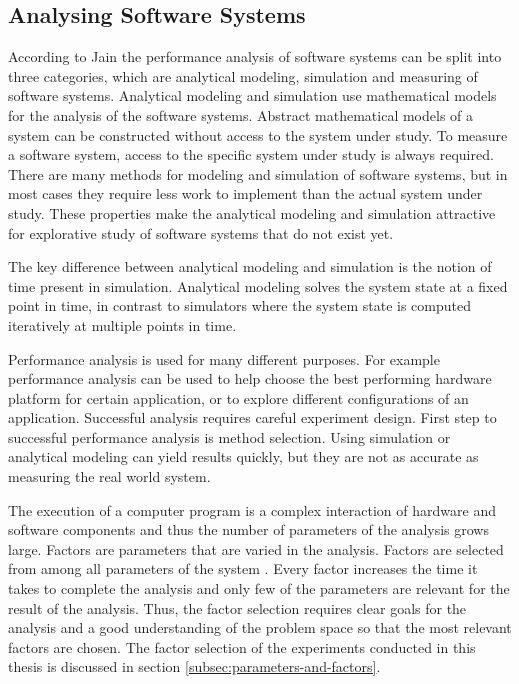 \subsection{Analysing Software Systems}
\label{subsec:analysing-software}
According to Jain \cite{jain1991art} the performance analysis of software systems can be split into three categories, which are analytical modeling, simulation and measuring of software systems. Analytical modeling and simulation use mathematical models for the analysis of the software systems. Abstract mathematical models of a system can be constructed without access to the system under study. To measure a software system, access to the specific system under study is always required. There are many methods for modeling and simulation of software systems, but in most cases they require less work to implement than the actual system under study. These properties make the analytical modeling and simulation attractive for explorative study of software systems that do not exist yet.~\cite{jain1991art}

The key difference between analytical modeling and simulation is the notion of time present in simulation. Analytical modeling solves the system state at a fixed point in time, in contrast to simulators where the system state is computed iteratively at multiple points in time.~\cite{jain1991art}

Performance analysis is used for many different purposes. For example performance analysis can be used to help choose the best performing hardware platform for certain application, or to explore different configurations of an application. Successful analysis requires careful experiment design. First step to successful performance analysis is method selection. Using simulation or analytical modeling can yield results quickly, but they are not as accurate as measuring the real world system.~\cite{jain1991art}

The execution of a computer program is a complex interaction of hardware and software components and thus the number of parameters of the analysis grows large. Factors are parameters that are varied in the analysis. Factors are selected from among all parameters of the system \cite{jain1991art}. Every factor increases the time it takes to complete the analysis and only few of the parameters are relevant for the result of the analysis. Thus, the factor selection requires clear goals for the analysis and a good understanding of the problem space so that the most relevant factors are chosen. The factor selection of the experiments conducted in this thesis is discussed in section \ref{subsec:parameters-and-factors}.

